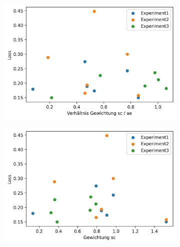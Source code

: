 	\begin{figure}[h]
	\centering
		\begin{subfigure}[c]{0.31\textwidth}		
		\includegraphics[width=1\textwidth, center]{bilder/Hauptteil/Step4_Data/Auto_Loss_Gewichtung.png}
		\end{subfigure}
		\begin{subfigure}[c]{0.31\textwidth}		
		\includegraphics[width=1\textwidth, center]{bilder/Hauptteil/Step4_Data/Auto_Loss_Gewichtung_SC.png}
		\end{subfigure}
		\begin{subfigure}[c]{0.31\textwidth}		

\end{subfigure}
\end{figure}
